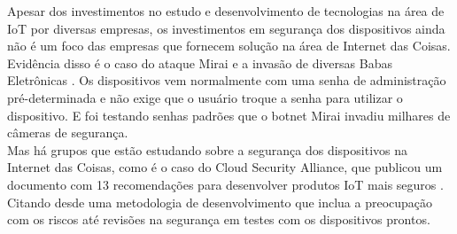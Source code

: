 \documentclass[12pt, a4paper]{article}
\begin{document}
Apesar dos investimentos no estudo e desenvolvimento de tecnologias na área de IoT por diversas empresas, os investimentos em segurança dos dispositivos ainda não é um foco das empresas que fornecem solução na área de Internet das Coisas. Evidência disso é o caso do ataque Mirai \cite{Mirai_Wired} e a invasão de diversas Babas Eletrônicas \cite{Baby_Monitor}. Os dispositivos vem normalmente com uma senha de administração pré-determinada e não exige que o usuário troque a senha para utilizar o dispositivo. E foi testando senhas padrões que o botnet Mirai invadiu milhares de câmeras de segurança.\\
Mas há grupos que estão estudando sobre a segurança dos dispositivos na Internet das Coisas, como é o caso do Cloud Security Alliance, que publicou um documento com 13 recomendações para desenvolver produtos IoT mais seguros \cite{13steps}. Citando desde uma metodologia de desenvolvimento que inclua a preocupação com os riscos até revisões na segurança em testes com os dispositivos prontos. 

\section{\sectionIII}
\label{sec:project}


\section{\sectionIV}
\label{sec:experiments}


\section{\sectionVII}
\label{sec:result-analysis}


\section{\sectionIX}
\label{sec:conclusion}

\newpage


\end{document}
